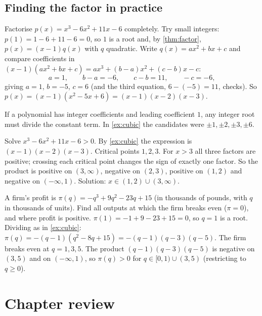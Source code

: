 \subsection{Finding the factor in practice}

\begin{example}
Factorise $p(x)=x^3-6x^2+11x-6$ completely.
\solution
Try small integers: $p(1)=1-6+11-6=0$, so $1$ is a root and, by \cref{thm:factor}, $p(x)=(x-1)q(x)$ with $q$ quadratic.
Write $q(x)=ax^2+bx+c$ and compare coefficients in $(x-1)(ax^2+bx+c)=ax^3+(b-a)x^2+(c-b)x-c$:
\[
a=1,\qquad b-a=-6,\qquad c-b=11,\qquad -c=-6,
\]
giving $a=1$, $b=-5$, $c=6$ (and the third equation, $6-(-5)=11$, checks). So $p(x)=(x-1)(x^2-5x+6)=(x-1)(x-2)(x-3)$.
\end{example}

\begin{external}
If a polynomial has integer coefficients and leading coefficient $1$, any integer root must divide the constant term. In
\cref{ex:cubic} the candidates were $\pm1,\pm2,\pm3,\pm6$.
\end{external}

\begin{example}
Solve $x^3-6x^2+11x-6>0$.
\solution
By \cref{ex:cubic} the expression is $(x-1)(x-2)(x-3)$. Critical points $1,2,3$. For $x>3$ all three factors are positive;
crossing each critical point changes the sign of exactly one factor. So the product is positive on $(3,\infty)$, negative
on $(2,3)$, positive on $(1,2)$ and negative on $(-\infty,1)$. Solution: $x\in(1,2)\cup(3,\infty)$.
\end{example}

\begin{example}
A firm's profit is $\pi(q)=-q^3+9q^2-23q+15$ (in thousands of pounds, with $q$ in thousands of units). Find all outputs at
which the firm breaks even ($\pi=0$), and where profit is positive.
\solution
$\pi(1)=-1+9-23+15=0$, so $q=1$ is a root. Dividing as in \cref{ex:cubic}: $\pi(q)=-(q-1)(q^2-8q+15)=-(q-1)(q-3)(q-5)$. The
firm breaks even at $q=1,3,5$. The product $(q-1)(q-3)(q-5)$ is negative on $(3,5)$ and on $(-\infty,1)$, so $\pi(q)>0$ for
$q\in[0,1)\cup(3,5)$ (restricting to $q\ge0$).
\end{example}

\section{Chapter review}

